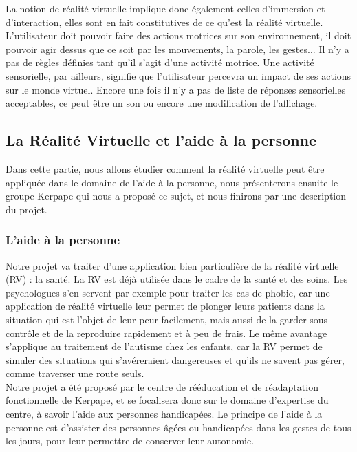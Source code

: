 La notion de réalité virtuelle implique donc également celles d'immersion et d'interaction, elles sont en fait constitutives de ce qu'est la réalité virtuelle. L'utilisateur doit pouvoir faire des actions motrices sur son environnement, il doit pouvoir agir dessus que ce soit par les mouvements, la parole, les gestes... Il n'y a pas de règles définies tant qu'il s'agit d'une activité motrice.
Une activité sensorielle, par ailleurs, signifie que l'utilisateur percevra un impact de ses actions sur le monde virtuel. Encore une fois il n'y a pas de liste de réponses sensorielles acceptables, ce peut être un son ou encore une modification de l'affichage.


\subsection{La Réalité Virtuelle et l'aide à la personne}

Dans cette partie, nous allons étudier comment la réalité virtuelle peut être appliquée dans le domaine de l'aide à la personne, nous présenterons ensuite le groupe Kerpape qui nous a proposé ce sujet, et nous finirons par une description du projet.

\subsubsection{L'aide à la personne}

Notre projet va traiter d'une application bien particulière de la réalité virtuelle (RV) : la santé. La RV est déjà utilisée dans le cadre de la santé et des soins. Les psychologues s'en servent par exemple pour traiter les cas de phobie, car une application de réalité virtuelle leur permet de plonger leurs patients dans la situation qui est l'objet de leur peur facilement, mais aussi de la garder sous contrôle et de la reproduire rapidement et à peu de frais. Le même avantage s'applique au traitement de l'autisme chez les enfants, car la RV permet de simuler des situations qui s'avéreraient dangereuses et qu'ils ne savent pas gérer, comme traverser une route seuls.\cite{traiteRV4}\\

Notre projet a été proposé par le centre de rééducation et de réadaptation fonctionnelle de Kerpape, et se focalisera donc sur le domaine d'expertise du centre, à savoir l'aide aux personnes handicapées. Le principe de l'aide à la personne est d'assister des personnes âgées ou handicapées dans les gestes de tous les jours, pour leur permettre de conserver leur autonomie.

